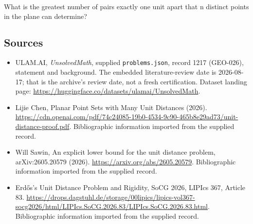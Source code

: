 \documentclass[11pt,a4paper]{article}
\begin{document}
What is the greatest number of pairs exactly one unit apart that n distinct points in the plane can determine?

\subsection{Sources}

{\small

\begin{itemize}

\item[\hypertarget{source:1217:1}{S1}] ULAM.AI, \emph{UnsolvedMath}, supplied \texttt{problems.json}, record 1217 (GEO-026), statement and background. The embedded literature-review date is 2026-08-17; that is the archive’s review date, not a fresh certification. Dataset landing page: \url{https://huggingface.co/datasets/ulamai/UnsolvedMath}.

\item[\hypertarget{source:1217:2}{S2}] Lijie Chen, Planar Point Sets with Many Unit Distances (2026). \url{https://cdn.openai.com/pdf/74c24085-19b0-4534-9c90-465b8e29ad73/unit-distance-proof.pdf}. Bibliographic information imported from the supplied record.

\item[\hypertarget{source:1217:3}{S3}] Will Sawin, An explicit lower bound for the unit distance problem, arXiv:2605.20579 (2026). \url{https://arxiv.org/abs/2605.20579}. Bibliographic information imported from the supplied record.

\item[\hypertarget{source:1217:4}{S4}] Erdős's Unit Distance Problem and Rigidity, SoCG 2026, LIPIcs 367, Article 83. \url{https://drops.dagstuhl.de/storage/00lipics/lipics-vol367-socg2026/html/LIPIcs.SoCG.2026.83/LIPIcs.SoCG.2026.83.html}. Bibliographic information imported from the supplied record.

\end{itemize}

}

\label{end:1217}
\end{document}
